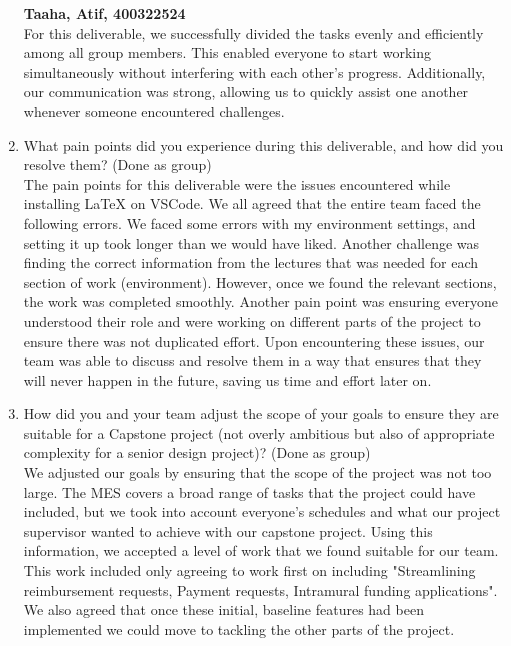 \documentclass{article}
\begin{document}
\begin{enumerate}
    \textbf{Taaha, Atif, 400322524} \\
    For this deliverable, we successfully divided the tasks evenly and efficiently among all group members. This enabled everyone to start working simultaneously without interfering with each other's progress. Additionally, our communication was strong, allowing us to quickly assist one another whenever someone encountered challenges.
    \item What pain points did you experience during this deliverable, and how
    did you resolve them? (Done as group) \\
    The pain points for this deliverable were the issues encountered while installing LaTeX on VSCode. We all agreed that the entire team faced the following errors. We faced some errors with my environment settings, and setting it up took longer than we would have liked. Another challenge was finding the correct information from the lectures that was needed for each section of work (environment). However, once we found the relevant sections, the work was completed smoothly. Another pain point was ensuring everyone understood their role and were working on different parts of the project to ensure there was not duplicated effort. Upon encountering these issues, our team was able to discuss and resolve them in a way that ensures that they will never happen in the future, saving us time and effort later on.
    \item How did you and your team adjust the scope of your goals to ensure
    they are suitable for a Capstone project (not overly ambitious but also of
    appropriate complexity for a senior design project)? (Done as group)\\
    We adjusted our goals by ensuring that the scope of the project was not too large. The MES covers a broad range of tasks that the project could have included, but we took into account everyone's schedules and what our project supervisor wanted to achieve with our capstone project. Using this information, we accepted a level of work that we found suitable for our team. This work included only agreeing to work first on including "Streamlining reimbursement requests, Payment requests, Intramural funding applications". We also agreed that once these initial, baseline features had been implemented we could move to tackling the other parts of the project.
\end{enumerate}
\end{document}
